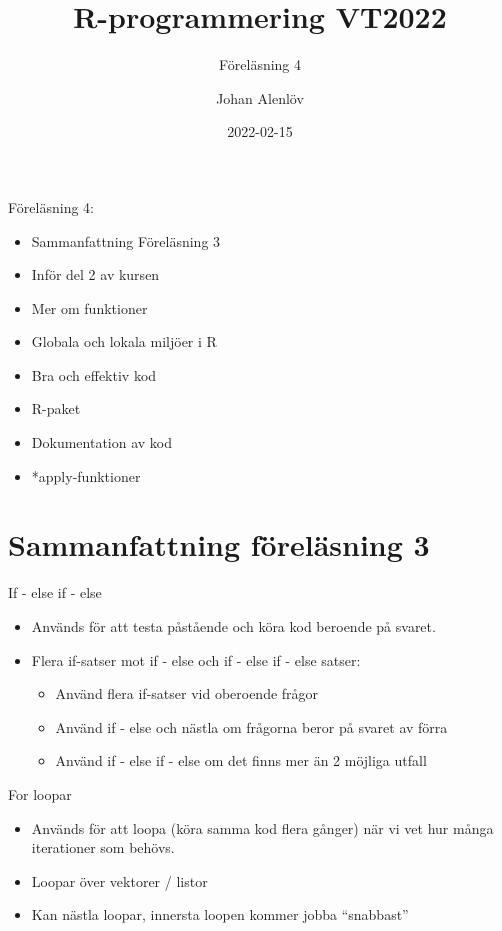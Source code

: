 \documentclass[
  11pt,
  ignorenonframetext,
]{beamer}
\title{R-programmering VT2022}
\subtitle{Föreläsning 4}
\author{Johan Alenlöv}
\date{2022-02-15}
\institute{Linköpings Universitet}
\providecommand{\tightlist}{%
  \setlength{\itemsep}{0pt}\setlength{\parskip}{0pt}}
\begin{document}
\frame{\titlepage}

\begin{frame}{Föreläsning 4:}
\protect\hypertarget{fuxf6reluxe4sning-4}{}
\begin{itemize}
\tightlist
\item
  Sammanfattning Föreläsning 3
\item
  Inför del 2 av kursen
\item
  Mer om funktioner
\item
  Globala och lokala miljöer i R
\item
  Bra och effektiv kod
\item
  R-paket
\item
  Dokumentation av kod
\item
  *apply-funktioner
\end{itemize}
\end{frame}

\hypertarget{sammanfattning-fuxf6reluxe4sning-3}{%
\section{Sammanfattning föreläsning
3}\label{sammanfattning-fuxf6reluxe4sning-3}}

\begin{frame}{If - else if - else}
\protect\hypertarget{if---else-if---else}{}
\begin{itemize}
\tightlist
\item
  Används för att testa påstående och köra kod beroende på svaret.
\item
  Flera if-satser mot if - else och if - else if - else satser:

  \begin{itemize}
  \tightlist
  \item
    Använd flera if-satser vid oberoende frågor
  \item
    Använd if - else och nästla om frågorna beror på svaret av förra
  \item
    Använd if - else if - else om det finns mer än 2 möjliga utfall
  \end{itemize}
\end{itemize}
\end{frame}

\begin{frame}{For loopar}
\protect\hypertarget{for-loopar}{}
\begin{itemize}
\tightlist
\item
  Används för att loopa (köra samma kod flera gånger) när vi vet hur
  många iterationer som behövs.
\item
  Loopar över vektorer / listor
\item
  Kan nästla loopar, innersta loopen kommer jobba ``snabbast''
\end{itemize}
\end{frame}
\end{document}

